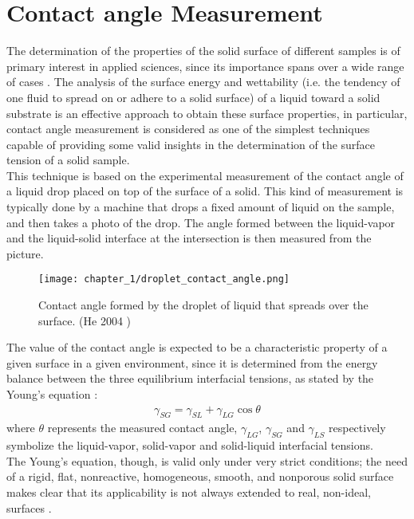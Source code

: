 \section{Contact angle Measurement}
\label{sec:contact_angle_measurement}
The determination of the properties of the solid surface of different samples is of primary interest in applied sciences, since its importance spans over a wide range of cases \cite{kwokContactAngleMeasurement1999}. The analysis of the surface energy and wettability (i.e. the tendency of one fluid to spread on or adhere to a solid surface) of a liquid toward a solid substrate is an effective approach to obtain these surface properties, in particular, contact angle measurement is considered as one of the simplest techniques capable of providing some valid insights in the determination of the surface tension of a solid sample.
\\
This technique is based on the experimental measurement of the contact angle of a liquid drop placed on top of the surface of a solid. This kind of measurement is typically done by a machine that drops a fixed amount of liquid on the sample, and then takes a photo of the drop. The angle formed between the liquid-vapor and the liquid-solid interface at the intersection is then measured from the picture.
\begin{figure}[H]
    \centering
    \texttt{[image: chapter\_1/droplet\_contact\_angle.png]}
    \vspace*{10pt}
    \caption{Contact angle formed by the droplet of liquid that spreads over the surface. (He 2004 \cite{heContactAngleHysteresis2004})}
    \label{fig:contact_angle_example}
\end{figure}
The value of the contact angle is expected to be a characteristic property of a given surface in a given environment, since it is determined from the energy balance between the three equilibrium interfacial tensions, as stated by the Young's equation \cite{youngEssayCohesionFluids1805}:
\begin{align}
    \gamma_{SG} = \gamma_{SL} + \gamma_{LG} \cos\theta \label{eq:young_equation}
\end{align}
where $\theta$ represents the measured contact angle, $\gamma_{LG}$, $\gamma_{SG}$ and $\gamma_{LS}$ respectively symbolize the liquid-vapor, solid-vapor and solid-liquid interfacial tensions.
\\
The Young's equation, though, is valid only under very strict conditions; the need of a rigid, flat, nonreactive, homogeneous, smooth, and nonporous solid surface makes clear that its applicability is not always extended to real, non-ideal, surfaces \cite{kwokMeasuringInterpretingContact1998}.
